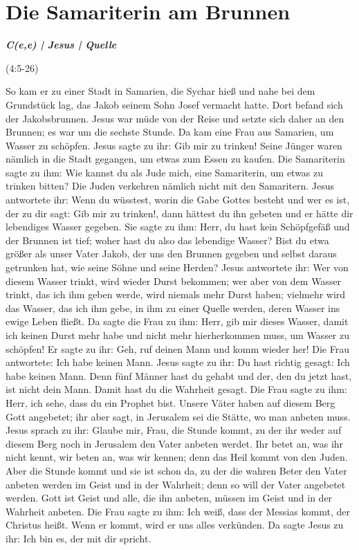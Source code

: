 \newpage
\section{Die Samariterin am Brunnen}

\textbf{\textit{C(e,e) | Jesus | Quelle}}

(4:5-26)
\begin{BibelSt}
So kam er zu einer Stadt in Samarien, die Sychar hieß und nahe bei dem Grundstück lag, das Jakob seinem Sohn Josef vermacht hatte. Dort befand sich der Jakobsbrunnen. Jesus war müde von der Reise und setzte sich daher an den Brunnen; es war um die sechste Stunde.
Da kam eine Frau aus Samarien, um Wasser zu schöpfen. Jesus sagte zu ihr: Gib mir zu trinken! Seine Jünger waren nämlich in die Stadt gegangen, um etwas zum Essen zu kaufen. Die Samariterin sagte zu ihm: Wie kannst du als Jude mich, eine Samariterin, um etwas zu trinken bitten? Die Juden verkehren nämlich nicht mit den Samaritern. Jesus antwortete ihr: Wenn du wüsstest, worin die Gabe Gottes besteht und wer es ist, der zu dir sagt: Gib mir zu trinken!, dann hättest du ihn gebeten und er hätte dir lebendiges Wasser gegeben. Sie sagte zu ihm: Herr, du hast kein Schöpfgefäß und der Brunnen ist tief; woher hast du also das lebendige Wasser? Bist du etwa größer als unser Vater Jakob, der uns den Brunnen gegeben und selbst daraus getrunken hat, wie seine Söhne und seine Herden? Jesus antwortete ihr: Wer von diesem Wasser trinkt, wird wieder Durst bekommen; wer aber von dem Wasser trinkt, das ich ihm geben werde, wird niemals mehr Durst haben; vielmehr wird das Wasser, das ich ihm gebe, in ihm zu einer Quelle werden, deren Wasser ins ewige Leben fließt. Da sagte die Frau zu ihm: Herr, gib mir dieses Wasser, damit ich keinen Durst mehr habe und nicht mehr hierherkommen muss, um Wasser zu schöpfen!
Er sagte zu ihr: Geh, ruf deinen Mann und komm wieder her! Die Frau antwortete: Ich habe keinen Mann. Jesus sagte zu ihr: Du hast richtig gesagt: Ich habe keinen Mann. Denn fünf Männer hast du gehabt und der, den du jetzt hast, ist nicht dein Mann. Damit hast du die Wahrheit gesagt. Die Frau sagte zu ihm: Herr, ich sehe, dass du ein Prophet bist. Unsere Väter haben auf diesem Berg Gott angebetet; ihr aber sagt, in Jerusalem sei die Stätte, wo man anbeten muss. Jesus sprach zu ihr: Glaube mir, Frau, die Stunde kommt, zu der ihr weder auf diesem Berg noch in Jerusalem den Vater anbeten werdet. Ihr betet an, was ihr nicht kennt, wir beten an, was wir kennen; denn das Heil kommt von den Juden. Aber die Stunde kommt und sie ist schon da, zu der die wahren Beter den Vater anbeten werden im Geist und in der Wahrheit; denn so will der Vater angebetet werden. Gott ist Geist und alle, die ihn anbeten, müssen im Geist und in der Wahrheit anbeten. Die Frau sagte zu ihm: Ich weiß, dass der Messias kommt, der Christus heißt. Wenn er kommt, wird er uns alles verkünden. Da sagte Jesus zu ihr: Ich bin es, der mit dir spricht.
\end{BibelSt}

